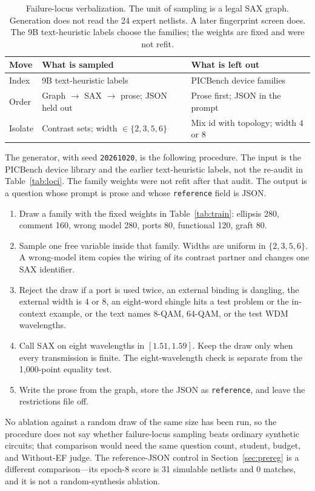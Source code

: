 \documentclass[11pt]{article}
\begin{document}
\begin{table}[H]
\caption{Failure-locus verbalization.
The unit of sampling is a legal SAX graph.
Generation does not read the 24 expert netlists.
A later fingerprint screen does.
The 9B text-heuristic labels choose the families; the weights are fixed and were not refit.}
\label{tab:construct}
\begin{center}
\begin{small}
\begin{tabular}{lll}
\toprule
Move & What is sampled & What is left out \\
\midrule
Index & 9B text-heuristic labels & PICBench device families \\
Order & Graph $\to$ SAX $\to$ prose; JSON held out & Prose first; JSON in the prompt \\
Isolate & Contrast sets; width $\in \{2,3,5,6\}$ & Mix id with topology; width $4$ or $8$ \\
\bottomrule
\end{tabular}
\end{small}
\end{center}
\end{table}

The generator, with seed \texttt{20261020}, is the following procedure.
The input is the PICBench device library and the earlier text-heuristic labels, not the re-audit in Table~\ref{tab:loci}.
The family weights were not refit after that audit.
The output is a question whose prompt is prose and whose \texttt{reference} field is JSON.
\begin{enumerate}
\item Draw a family with the fixed weights in Table~\ref{tab:train}: ellipsis 280, comment 160, wrong model 280, ports 80, functional 120, graft 80.
\item Sample one free variable inside that family.
Widths are uniform in $\{2,3,5,6\}$.
A wrong-model item copies the wiring of its contrast partner and changes one SAX identifier.
\item Reject the draw if a port is used twice, an external binding is dangling, the external width is $4$ or $8$, an eight-word shingle hits a test problem or the in-context example, or the text names 8-QAM, 64-QAM, or the test WDM wavelengths.
\item Call SAX on eight wavelengths in $[1.51, 1.59]$.
Keep the draw only when every transmission is finite.
The eight-wavelength check is separate from the 1{,}000-point equality test.
\item Write the prose from the graph, store the JSON as \texttt{reference}, and leave the restrictions file off.
\end{enumerate}
No ablation against a random draw of the same size has been run, so the procedure does not say whether failure-locus sampling beats ordinary synthetic circuits; that comparison would need the same question count, student, budget, and Without-EF judge.
The reference-JSON control in Section~\ref{sec:prereg} is a different comparison---its epoch-8 score is 31 simulable netlists and 0 matches, and it is not a random-synthesis ablation.
\end{document}
